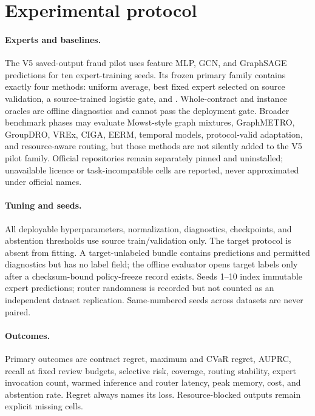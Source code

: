 \section{Experimental protocol}



\paragraph{Experts and baselines.}
The V5 saved-output fraud pilot uses feature MLP, GCN, and GraphSAGE predictions for ten expert-training seeds. Its frozen primary family contains exactly four methods: uniform average, best fixed expert selected on source validation, a source-trained logistic gate, and \method{}. Whole-contract and instance oracles are offline diagnostics and cannot pass the deployment gate. Broader benchmark phases may evaluate Mowst-style graph mixtures, GraphMETRO, GroupDRO, VREx, CIGA, EERM, temporal models, protocol-valid adaptation, and resource-aware routing, but those methods are not silently added to the V5 pilot family. Official repositories remain separately pinned and uninstalled; unavailable licence or task-incompatible cells are reported, never approximated under official names.

\paragraph{Tuning and seeds.}
All deployable hyperparameters, normalization, diagnostics, checkpoints, and abstention thresholds use source train/validation only. The target protocol is absent from fitting. A target-unlabeled bundle contains predictions and permitted diagnostics but has no label field; the offline evaluator opens target labels only after a checksum-bound policy-freeze record exists. Seeds 1--10 index immutable expert predictions; router randomness is recorded but not counted as an independent dataset replication. Same-numbered seeds across datasets are never paired.

\paragraph{Outcomes.}
Primary outcomes are contract regret, maximum and CVaR regret, AUPRC, recall at fixed review budgets, selective risk, coverage, routing stability, expert invocation count, warmed inference and router latency, peak memory, cost, and abstention rate. Regret always names its loss. Resource-blocked outputs remain explicit missing cells.

